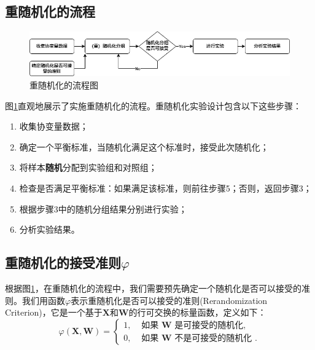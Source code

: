 \subsection{重随机化的流程}

\begin{figure}[!hbtp]
    \centering
    \includegraphics[width=1\linewidth]{figures/重随机化流程.png}
    \caption{重随机化的流程图}
    \label{fig:procedure of rerandomization}
\end{figure}

图\ref{fig:procedure of rerandomization}直观地展示了实施重随机化的流程。重随机化实验设计包含以下这些步骤：
\begin{enumerate}
    \item 收集协变量数据；
    \item 确定一个平衡标准，当随机化满足这个标准时，接受此次随机化；
    \item 将样本\textbf{随机}分配到实验组和对照组；
    \item 检查是否满足平衡标准：如果满足该标准，则前往步骤5；否则，返回步骤3；
    \item 根据步骤3中的随机分组结果分别进行实验；
    \item 分析实验结果。
\end{enumerate}

\subsection{重随机化的接受准则$\varphi$}\label{重随机化的接受准则}

根据图\ref{fig:procedure of rerandomization}，在重随机化的流程中，我们需要预先确定一个随机化是否可以接受的准则。我们用函数$\varphi$表示重随机化是否可以接受的准则(Rerandomization Criterion)，它是一个基于$\mathbf{X}$和$\mathbf{W}$的行可交换的标量函数，定义如下：
\begin{equation}
\varphi(\mathbf{X}, \mathbf{W})= \begin{cases}1, & \text { 如果 } \mathbf{W} \text { 是可接受的随机化, } \\ 0, & \text { 如果 } \mathbf{W} \text { 不是可接受的随机化 }.\end{cases}
\end{equation}

